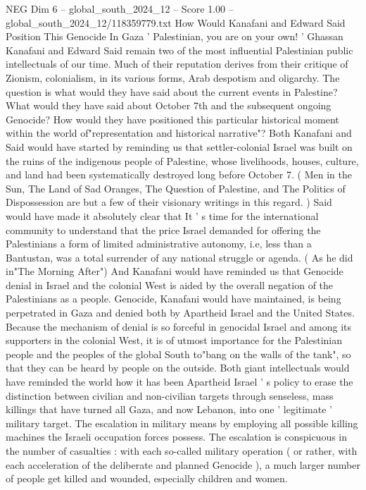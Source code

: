 \begin{textsample}{NEG Dim 6 – global\_south\_2024\_12 – Score 1.00 – global\_south\_2024\_12/118359779.txt}  \label{ex:f6_neg_125}
How Would Kanafani and Edward Said Position This Genocide In Gaza ' Palestinian, you are on your own! ' Ghassan Kanafani and Edward Said remain two of the most influential Palestinian public intellectuals of our time.
Much of their reputation derives from their critique of Zionism, colonialism, in its various forms, Arab despotism and oligarchy.
The question is what would they have said about the current events in Palestine?
What would they have said about October 7th and the subsequent ongoing Genocide?
How would they have positioned this particular historical moment within the world of"representation and historical narrative"?
Both Kanafani and Said would have started by reminding us that settler-colonial Israel was built on the ruins of the indigenous people of Palestine, whose livelihoods, houses, culture, and land had been systematically destroyed long before October 7. ( Men in the Sun, The Land of Sad Oranges, The Question of Palestine, and The Politics of Dispossession are but a few of their visionary writings in this regard. ) Said would have made it absolutely clear that It ' s time for the international community to understand that the price Israel demanded for offering the Palestinians a form of limited administrative autonomy, i.e, less than a Bantustan, was a total surrender of any national struggle or agenda. ( As he did in"The Morning After") And Kanafani would have reminded us that Genocide denial in Israel and the colonial West is aided by the overall negation of the Palestinians as a people.
Genocide, Kanafani would have maintained, is being perpetrated in Gaza and denied both by Apartheid Israel and the United States.
Because the mechanism of denial is so forceful in genocidal Israel and among its supporters in the colonial West, it is of utmost importance for the Palestinian people and the peoples of the global South to"bang on the walls of the tank", so that they can be heard by people on the outside.
Both giant intellectuals would have reminded the world how it has been Apartheid Israel ' s policy to erase the distinction between civilian and non-civilian targets through senseless, mass killings that have turned all Gaza, and now Lebanon, into one ' legitimate ' military target.
The escalation in military means by employing all possible killing machines the Israeli occupation forces possess.
The escalation is conspicuous in the number of casualties : with each so-called military operation ( or rather, with each acceleration of the deliberate and planned Genocide ), a much larger number of people get killed and wounded, especially children and women.

\end{textsample}
